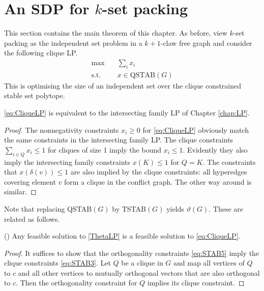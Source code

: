 
\section{An SDP for $k$-set packing}\label{sec:SDP}

This section contains the main theorem of this chapter. %
As before, view $k$-set packing as the independent set problem in a $k+1$-claw free graph and consider the following clique LP.
%
\begin{equation}\tag{Clique LP}\label{eq:CliqueLP}
\begin{alignedat}{2}
\text{max}  \quad & \sum_i x_i \ \\
\text{s.t.} \quad & x \in \textrm{QSTAB}(G)
\end{alignedat}
\end{equation}
%
This is optimising the size of an independent set over the clique constrained stable set polytope.
%
\begin{lemma}\label{lem:SDPnew1}
\eqref{eq:CliqueLP} is equivalent to the intersecting family LP of Chapter \ref{chap:LP}.
\end{lemma}
%
\begin{proof}
The nonnegativity constraints $x_i \geq 0$ for \eqref{eq:CliqueLP} obviously match the same constraints in the intersecting family LP. The clique constraints $\sum_{i \in Q} x_i \leq 1$ for cliques of size 1 imply the bound $x_i \leq 1$. Evidently they also imply the intersecting family constraints $x(K) \leq 1$ for $Q = K$. The constraints that $x(\delta(v)) \leq 1$ are also implied by the clique constraints: all hyperedges covering element $v$ form a clique in the conflict graph. The other way around is similar.
\end{proof}
%
Note that replacing QSTAB$(G)$ by TSTAB$(G)$ yields $\vartheta(G)$. These are related as follows.
%
\begin{lemma}(\cite[Lemma 4.3]{LapChiLau})\label{lem:SDPnew2}
Any feasible solution to \eqref{ThetaLP} is a feasible solution to \eqref{eq:CliqueLP}.
\end{lemma}
%
\begin{proof}
It suffices to show that the orthogonality constraints \eqref{eq:STAB5} imply the clique constraints \eqref{eq:STAB3}. Let $Q$ be a clique in $G$ and map all vertices of $Q$ to $c$ and all other vertices to mutually orthogonal vectors that are also orthogonal to $c$. Then the orthogonality constraint for $Q$ implies its clique constraint.
\end{proof}
